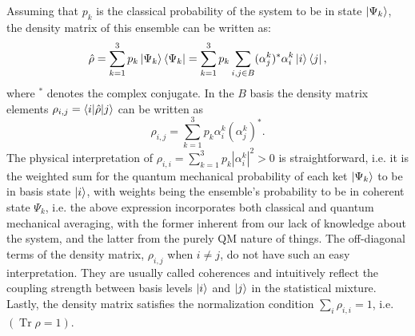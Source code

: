 \documentclass[]{spie}  %
\def\h{\hat}
\DeclareMathOperator{\Tr}{Tr}
\begin{document}
 Assuming that $p_k$ is the classical probability of the system to be in state $\ket{\Psi_k}$, the density matrix of this ensemble can be written as:
 \begin{align}
 \label{eq:densitymatrix-operator}
 \h \rho = \sum_{k=1}^3 p_k \ket{\Psi_k}\bra{\Psi_k} = \sum_{k=1}^3 p_k \sum_{i,j \in B}(\alpha_j^k)^*\alpha_i^k\ket{i}\bra{j}, 
 \end{align}
 where $^*$ denotes the complex conjugate. In the $B$ basis the density matrix elements $\rho_{i,j} = \braket{i|\h \rho| j}$ can be written as
 \begin{equation}
 \label{eq:dmelements}
 \rho_{i,j} = \sum_{k=1}^{3} p_k \alpha_i^k(\alpha_j^k)^*.
 \end{equation}
 The physical interpretation of $\rho_{i,i} = \sum_{k=1}^{3} p_k |\alpha_i^k|^2 > 0 $ is straightforward, i.e. it is the weighted sum for the quantum mechanical probability of each ket $\Ket{\Psi_k}$ to be in basis state $\ket{i}$, with weights being the ensemble's probability to be in coherent state $\Psi_k$, i.e. the above expression incorporates both classical and quantum mechanical averaging, with the former inherent from our lack of knowledge about the system, and the latter from the purely QM nature of things. The off-diagonal terms of the density matrix, $\rho_{i,j}$ when $i\neq j$, do not have such an easy interpretation. They are usually called coherences and intuitively reflect the coupling strength between basis levels $\ket{i}$ and $\ket{j}$ in the statistical mixture. Lastly, the density matrix satisfies the normalization condition $\sum_i \rho_{i,i} = 1$, i.e.  $( \Tr{\rho} = 1)$. 
 
\end{document}
